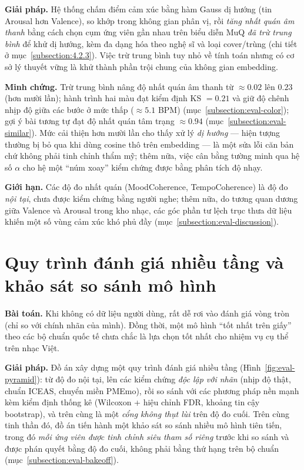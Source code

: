 \documentclass[../DoAn.tex]{subfiles}
\begin{document}
\textbf{Giải pháp.} Hệ thống chấm điểm cảm xúc bằng hàm Gauss dị hướng (tin Arousal hơn Valence), so khớp trong không gian phân vị, rồi \textit{tăng nhất quán âm thanh} bằng cách chọn cụm ứng viên gần nhau trên biểu diễn MuQ \textit{đã trừ trung bình} để khử dị hướng, kèm đa dạng hóa theo nghệ sĩ và loại cover/trùng (chi tiết ở mục~\ref{subsection:4.2.3}). Việc trừ trung bình tuy nhỏ về tính toán nhưng có cơ sở lý thuyết vững là khử thành phần trội chung của không gian embedding.

\textbf{Minh chứng.} Trừ trung bình nâng độ nhất quán âm thanh từ $\approx 0.02$ lên $0.23$ (hơn mười lần); hành trình hai màu đạt kiểm định KS $= 0.21$ và giữ độ chênh nhịp độ giữa các bước ở mức thấp ($\approx 5.1$ BPM) (mục~\ref{subsection:eval-color}); gợi ý bài tương tự đạt độ nhất quán tâm trạng $\approx 0.94$ (mục~\ref{subsection:eval-similar}). Mức cải thiện hơn mười lần cho thấy xử lý \textit{dị hướng} --- hiện tượng thường bị bỏ qua khi dùng cosine thô trên embedding --- là một sửa lỗi căn bản chứ không phải tinh chỉnh thẩm mỹ; thêm nữa, việc cân bằng tường minh qua hệ số $\alpha$ cho hệ một ``núm xoay'' kiểm chứng được bằng phân tích độ nhạy.

\textbf{Giới hạn.} Các độ đo nhất quán (MoodCoherence, TempoCoherence) là độ đo \textit{nội tại}, chưa được kiểm chứng bằng người nghe; thêm nữa, do tương quan dương giữa Valence và Arousal trong kho nhạc, các góc phần tư lệch trục thưa dữ liệu khiến một số vùng cảm xúc khó phủ đầy (mục~\ref{subsection:eval-discussion}).

\section{Quy trình đánh giá nhiều tầng và khảo sát so sánh mô hình}
\label{section:5.4}
\textbf{Bài toán.} Khi không có dữ liệu người dùng, rất dễ rơi vào đánh giá vòng tròn (chỉ so với chính nhãn của mình). Đồng thời, một mô hình ``tốt nhất trên giấy'' theo các bộ chuẩn quốc tế chưa chắc là lựa chọn tốt nhất cho nhiệm vụ cụ thể trên nhạc Việt.

\textbf{Giải pháp.} Đồ án xây dựng một quy trình đánh giá nhiều tầng (Hình~\ref{fig:eval-pyramid}): từ độ đo nội tại, lên các kiểm chứng \textit{độc lập với nhãn} (nhịp độ thật, chuẩn ICEAS, chuyển miền PMEmo), rồi so sánh với các phương pháp nền mạnh kèm kiểm định thống kê (Wilcoxon + hiệu chỉnh FDR, khoảng tin cậy bootstrap), và trên cùng là một \textit{cổng không thụt lùi} trên độ đo cuối. Trên cùng tinh thần đó, đồ án tiến hành một khảo sát so sánh nhiều mô hình tiên tiến, trong đó \textit{mỗi ứng viên được tinh chỉnh siêu tham số riêng} trước khi so sánh và được phán quyết bằng độ đo cuối, không phải bằng thứ hạng trên bộ chuẩn (mục~\ref{subsection:eval-bakeoff}).
\end{document}
